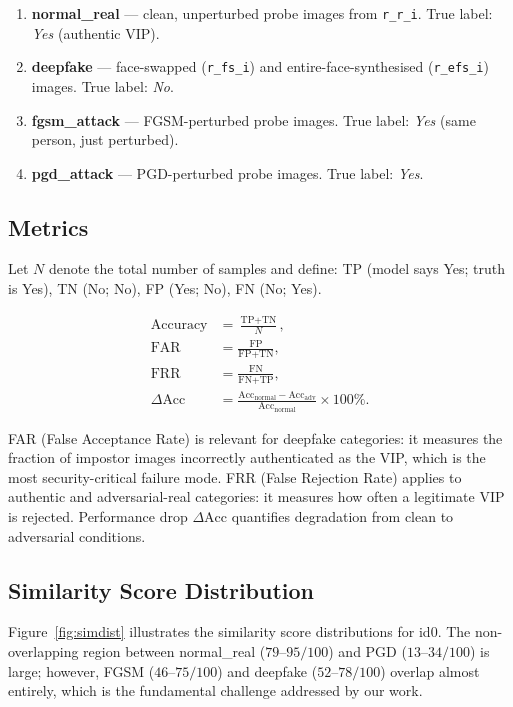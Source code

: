 \documentclass[12pt,a4paper]{article}
\begin{document}
\begin{enumerate}[leftmargin=*]
  \item \textbf{normal\_real} --- clean, unperturbed probe images from
        \texttt{r\_r\_i}. True label: \emph{Yes} (authentic VIP).
  \item \textbf{deepfake} --- face-swapped (\texttt{r\_fs\_i}) and
        entire-face-synthesised (\texttt{r\_efs\_i}) images.
        True label: \emph{No}.
  \item \textbf{fgsm\_attack} --- FGSM-perturbed probe images.
        True label: \emph{Yes} (same person, just perturbed).
  \item \textbf{pgd\_attack} --- PGD-perturbed probe images.
        True label: \emph{Yes}.
\end{enumerate}

\subsection{Metrics}

Let $N$ denote the total number of samples and define:
TP (model says Yes; truth is Yes),
TN (No; No), FP (Yes; No), FN (No; Yes).

\begin{align}
  \text{Accuracy} &= \frac{\text{TP} + \text{TN}}{N}, \label{eq:acc} \\[4pt]
  \text{FAR} &= \frac{\text{FP}}{\text{FP} + \text{TN}}, \label{eq:far} \\[4pt]
  \text{FRR} &= \frac{\text{FN}}{\text{FN} + \text{TP}}, \label{eq:frr} \\[4pt]
  \Delta\text{Acc} &= \frac{\text{Acc}_{\text{normal}} - \text{Acc}_{\text{adv}}}{\text{Acc}_{\text{normal}}} \times 100\%. \label{eq:drop}
\end{align}

FAR (False Acceptance Rate) is relevant for deepfake categories: it measures
the fraction of impostor images incorrectly authenticated as the VIP, which is
the most security-critical failure mode.  FRR (False Rejection Rate) applies to
authentic and adversarial-real categories: it measures how often a legitimate VIP
is rejected.  Performance drop $\Delta\text{Acc}$ quantifies degradation from
clean to adversarial conditions.

\subsection{Similarity Score Distribution}

Figure~\ref{fig:simdist} illustrates the similarity score distributions for id0.
The non-overlapping region between normal\_real ($79$--$95/100$) and PGD
($13$--$34/100$) is large; however, FGSM ($46$--$75/100$) and deepfake
($52$--$78/100$) overlap almost entirely, which is the fundamental challenge
addressed by our work.
\end{document}
